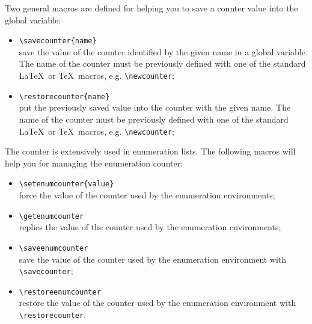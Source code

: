 \documentclass[book,taskpackage,specpackage,codepackage]{upmethodology-document}
\begin{document}
Two general macros are defined for helping you to save a counter value into the global variable: 
\begin{itemize}
\item \texttt{{\textbackslash}savecounter\{name\}} \\
	save the value of the counter identified by the given name in a global variable.
	The name of the counter must be previously defined with one of the standard \LaTeX\ or \TeX\ macros, e.g. \texttt{{\textbackslash}newcounter};
\item \texttt{{\textbackslash}restorecounter\{name\}} \\
	put the previously saved value into the counter with the given name.
	The name of the counter must be previously defined with one of the standard \LaTeX\ or \TeX\ macros, e.g. \texttt{{\textbackslash}newcounter};
\end{itemize}

The counter is extensively used in enumeration lists. The following macros will help you for managing the enumeration counter:
\begin{itemize}
\item \texttt{{\textbackslash}setenumcounter\{value\}} \\
	force the value of the counter used by the enumeration environments;
\item \texttt{{\textbackslash}getenumcounter} \\
	replies the value of the counter used by the enumeration environments;
\item \texttt{{\textbackslash}saveenumcounter} \\
	save the value of the counter used by the enumeration environment with \texttt{{\textbackslash}savecounter};
\item \texttt{{\textbackslash}restoreenumcounter} \\
	restore the value of the counter used by the enumeration environment with \texttt{{\textbackslash}restorecounter}.
\end{itemize}
\end{document}

